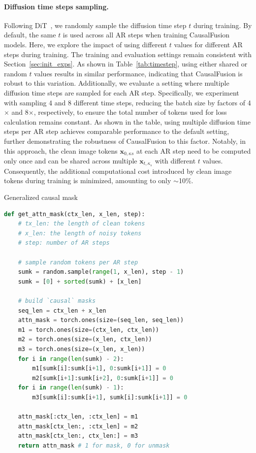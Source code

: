 \paragraph{Diffusion time steps sampling.}
Following DiT~\cite{dit}, we randomly sample the diffusion time step $t$ during training. By default, the same $t$ is used across all AR steps when training CausalFusion models. Here, we explore the impact of using different $t$ values for different AR steps during training. The training and evaluation settings remain consistent with Section~\ref{sec:init_exps}. As shown in Table~\ref{tab:timestep}, using either shared or random $t$ values results in similar performance, indicating that CausalFusion is robust to this variation.
Additionally, we evaluate a setting where multiple diffusion time steps are sampled for each AR step. Specifically, we experiment with sampling 4 and 8 different time steps, reducing the batch size by factors of 4$\times$ and 8$\times$, respectively, to ensure the total number of tokens used for loss calculation remains constant. As shown in the table, using multiple diffusion time steps per AR step achieves comparable performance to the default setting, further demonstrating the robustness of CausalFusion to this factor.
Notably, in this approach, the clean image tokens $\mathbf{x}_{0, \kappa{s}}$ at each AR step need to be computed only once and can be shared across multiple $\mathbf{x}_{t, \kappa_s}$ with different $t$ values. Consequently, the additional computational cost introduced by clean image tokens during training is minimized, amounting to only $\sim$10\%.
\vspace{-5pt}

\begin{algorithm}[t]
\caption{
Generalized causal mask}
\label{algo:gcm}
\begin{lstlisting}[language=python]
def get_attn_mask(ctx_len, x_len, step):
    # tx_len: the length of clean tokens
    # x_len: the length of noisy tokens
    # step: number of AR steps

    # sample random tokens per AR step
    sumk = random.sample(range(1, x_len), step - 1)
    sumk = [0] + sorted(sumk) + [x_len]

    # build `causal` masks
    seq_len = ctx_len + x_len
    attn_mask = torch.ones(size=(seq_len, seq_len))
    m1 = torch.ones(size=(ctx_len, ctx_len))
    m2 = torch.ones(size=(x_len, ctx_len))
    m3 = torch.ones(size=(x_len, x_len))
    for i in range(len(sumk) - 2):
        m1[sumk[i]:sumk[i+1], 0:sumk[i+1]] = 0
        m2[sumk[i+1]:sumk[i+2], 0:sumk[i+1]] = 0
    for i in range(len(sumk) - 1):
        m3[sumk[i]:sumk[i+1], sumk[i]:sumk[i+1]] = 0

    attn_mask[:ctx_len, :ctx_len] = m1
    attn_mask[ctx_len:, :ctx_len] = m2
    attn_mask[ctx_len:, ctx_len:] = m3
    return attn_mask # 1 for mask, 0 for unmask
\end{lstlisting}
\end{algorithm}


